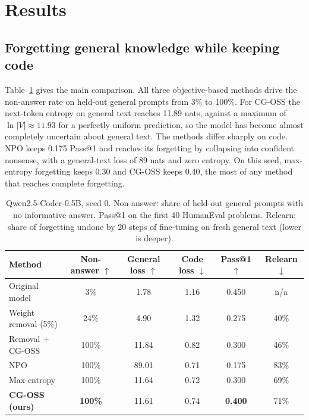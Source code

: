 \documentclass{article}
\begin{document}
\section{Results}
\label{sec:results}

\subsection{Forgetting general knowledge while keeping code}
Table~\ref{tab:main} gives the main comparison. All three objective-based methods drive the non-answer rate on held-out general prompts from 3\% to 100\%. For CG-OSS the next-token entropy on general text reaches 11.89 nats, against a maximum of $\ln|V|\approx 11.93$ for a perfectly uniform prediction, so the model has become almost completely uncertain about general text. The methods differ sharply on code. NPO keeps 0.175 Pass@1 and reaches its forgetting by collapsing into confident nonsense, with a general-text loss of 89 nats and zero entropy. On this seed, max-entropy forgetting keeps 0.30 and CG-OSS keeps 0.40, the most of any method that reaches complete forgetting.

\begin{table}[t]
\centering
\small
\caption{Qwen2.5-Coder-0.5B, seed 0. Non-answer: share of held-out general prompts with no informative answer. Pass@1 on the first 40 HumanEval problems. Relearn: share of forgetting undone by 20 steps of fine-tuning on fresh general text (lower is deeper).}
\label{tab:main}
\begin{tabular}{lccccc}
\toprule
Method & Non-answer $\uparrow$ & General loss $\uparrow$ & Code loss $\downarrow$ & Pass@1 $\uparrow$ & Relearn $\downarrow$ \\
\midrule
Original model & 3\% & 1.78 & 1.16 & 0.450 & n/a \\
Weight removal (5\%) & 24\% & 4.90 & 1.32 & 0.275 & 40\% \\
Removal + CG-OSS & 100\% & 11.84 & 0.82 & 0.300 & 46\% \\
NPO & 100\% & 89.01 & 0.71 & 0.175 & 83\% \\
Max-entropy & 100\% & 11.64 & 0.72 & 0.300 & 69\% \\
\textbf{CG-OSS (ours)} & \textbf{100\%} & 11.61 & 0.74 & \textbf{0.400} & 71\% \\
\bottomrule
\end{tabular}
\end{table}
\end{document}
